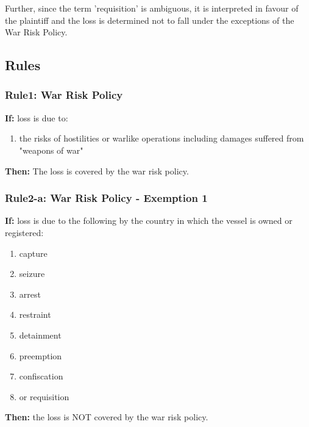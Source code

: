 Further, since the term 'requisition' is ambiguous, it is interpreted in favour of the plaintiff and the loss is determined not to fall under the exceptions of the War Risk Policy. 

\subsection{Rules}

\subsubsection{Rule1: War Risk Policy} 

    \textbf{If:} loss is due to:
    
    \begin{enumerate}
         \item the risks of hostilities or warlike operations including damages suffered from "weapons of war"
    \end{enumerate}
    
    
    \textbf{Then:} The loss is covered by the war risk policy.
        
\subsubsection{Rule2-a: War Risk Policy - Exemption 1}

    \textbf{If:} loss is due to the following by the country in which the vessel is owned or registered: 
    \begin{enumerate}
        \item capture
        \item seizure
        \item arrest
        \item restraint 
        \item detainment
        \item preemption
        \item confiscation
        \item or requisition
    \end{enumerate}
    
    \textbf{Then:} the loss is NOT covered by the war risk policy.
    
    

